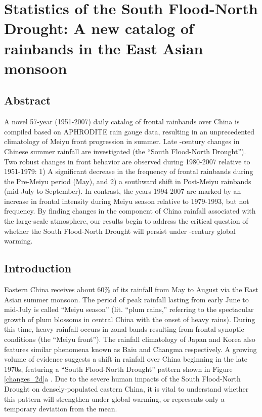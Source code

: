 \chapter{Statistics of the South Flood-North Drought: A new catalog of rainbands in the East Asian monsoon}


\section{Abstract}
A novel 57-year (1951-2007) daily catalog of frontal rainbands over China is compiled based on APHRODITE rain gauge data, resulting in an unprecedented climatology of Meiyu front progression in summer. Late -century changes in Chinese summer rainfall are investigated (the ``South Flood-North Drought''). Two robust changes in front behavior are observed during 1980-2007 relative to 1951-1979: 1) A significant decrease in the frequency of frontal rainbands during the Pre-Meiyu period (May), and 2) a southward shift in Post-Meiyu rainbands (mid-July to September). In contrast, the years 1994-2007 are marked by an increase in frontal intensity during Meiyu season relative to 1979-1993, but not frequency. By finding changes in the component of China rainfall associated with the large-scale atmosphere, our results begin to address the critical question of whether the South Flood-North Drought will persist under -century global warming.


\section{Introduction}

 	Eastern China receives about 60\% of its rainfall from May to August via the East Asian summer monsoon. The period of peak rainfall lasting from early June to mid-July is called ``Meiyu season'' (lit. ``plum rains,'' referring to the spectacular growth of plum blossoms in central China with the onset of heavy rains). During this time, heavy rainfall occurs in zonal bands resulting from frontal synoptic conditions (the ``Meiyu front''). The rainfall climatology of Japan and Korea also features similar phenomena known as Baiu and Changma respectively. A growing volume of evidence suggests a shift in rainfall over China beginning in the late 1970s, featuring a ``South Flood-North Drought'' pattern shown in Figure \ref{changes_2d}a \citep{Hu1997,Gong2002,Nigam2013}. Due to the severe human impacts of the South Flood-North Drought on densely-populated eastern China, it is vital to understand whether this pattern will strengthen under global warming, or represents only a temporary deviation from the mean.
 
